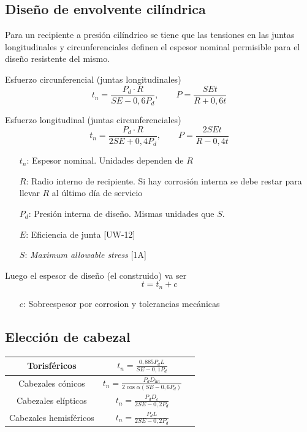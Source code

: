 \documentclass[twocolumn]{article}
\newcommand{\Dint}{D_\text{int}}
\begin{document}
\subsection{Diseño de envolvente cilíndrica}

Para un recipiente a presión cilíndrico se tiene que las tensiones en las juntas longitudinales y circunferenciales definen el espesor nominal permisible para el diseño resistente del mismo.

Esfuerzo circunferencial (juntas longitudinales)
\[
t_n = \frac{P_d \cdot  R}{SE - 0,6P_d}, \qquad P = \frac{S E t}{R+0,6t}
\]

Esfuerzo longitudinal (juntas circunferenciales)
\[
t_n = \frac{P_d \cdot R}{2SE + 0,4P_d}, \qquad P = \frac{2S E t}{R - 0,4t}
\]
\begin{itemize}
	\item[$t_n$:] Espesor nominal. Unidades dependen de $R$ 
	\item[$R$:] Radio interno de recipiente. Si hay corrosión interna se debe restar para llevar $R$ al último día de servicio
	\item[$P_d$:] Presión interna de diseño. Mismas unidades que $S$.
	\item[$E$:] Eficiencia de junta [UW-12]
	\item[$S$:] \textit{Maximum allowable stress} [1A]
\end{itemize}

Luego el espesor de diseño (el construido) va ser
\[
t = t_n + c
\]
\begin{itemize}
	\item[$c$:] Sobreespesor por corrosion y tolerancias mecánicas
\end{itemize}
\subsection{Elección de cabezal}

\begin{table}[htb!]
	\centering
	
	\bgroup
	\def\arraystretch{1.5}
	\begin{tabular}{|c|c|c|}
		\hline 
		Torisféricos& $t_n = \frac{0,885 P_d L}{SE - 0,1P_d}$ &  \\ 
		\hline 
		Cabezales cónicos&  $t_n = \frac{P_d \Dint}{2\cos \alpha (SE - 0,6P_d)}$  &  \\ 
		\hline  
		Cabezales elípticos&  $t_n = \frac{P_d D_{e}}{2SE - 0,2P_d}$  &  \\ 
		\hline  
		Cabezales hemisféricos&  $t_n = \frac{P_d L}{2SE - 0,2P_d}$  &  \\ 
		\hline  
	\end{tabular} 
	\egroup
\end{table}
\end{document}
